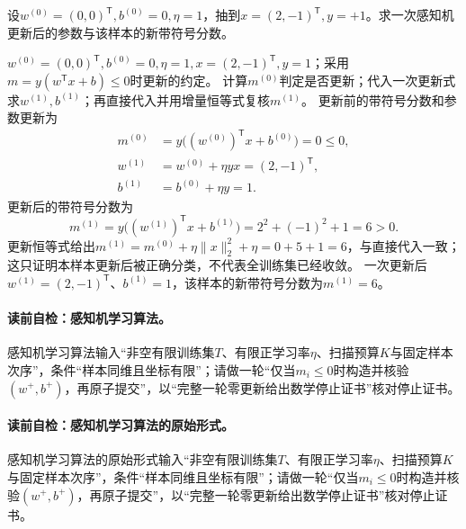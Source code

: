 \label{struct:V2-C01-CH18}
\begin{example}[一次误分类更新]\label{exm:V2-C01-update}
设$w^{(0)}=(0,0)^{\mathsf T},b^{(0)}=0,\eta=1$，抽到$x=(2,-1)^{\mathsf T},y=+1$。求一次感知机更新后的参数与该样本的新带符号分数。
\end{example}
\begin{solution}
\SolGiven $w^{(0)}=(0,0)^{\mathsf T},b^{(0)}=0,\eta=1,x=(2,-1)^{\mathsf T},y=1$；采用$m=y(w^{\mathsf T}x+b)\le0$时更新的约定。
\SolPlan 计算$m^{(0)}$判定是否更新；代入一次更新式求$w^{(1)},b^{(1)}$；再直接代入并用增量恒等式复核$m^{(1)}$。
\SolDerive
更新前的带符号分数和参数更新为
\[
\begin{aligned}
m^{(0)}&=y\bigl((w^{(0)})^{\mathsf T}x+b^{(0)}\bigr)=0\leq0,\\
w^{(1)}&=w^{(0)}+\eta yx=(2,-1)^{\mathsf T},\\
b^{(1)}&=b^{(0)}+\eta y=1.
\end{aligned}
\]
更新后的带符号分数为
\[
m^{(1)}
=y\bigl((w^{(1)})^{\mathsf T}x+b^{(1)}\bigr)
=2^2+(-1)^2+1
=6>0.
\]
\SolCheck 更新恒等式给出$m^{(1)}=m^{(0)}+\eta\|x\|_2^2+\eta=0+5+1=6$，与直接代入一致；这只证明本样本更新后被正确分类，不代表全训练集已经收敛。
\SolAnswer 一次更新后$w^{(1)}=(2,-1)^{\mathsf T}$、$b^{(1)}=1$，该样本的新带符号分数为$m^{(1)}=6$。
\end{solution}


\paragraph{读前自检：感知机学习算法。}感知机学习算法输入“非空有限训练集$T$、有限正学习率$\eta$、扫描预算$K$与固定样本次序”，条件“样本同维且坐标有限”；请做一轮“仅当$m_i\le0$时构造并核验$(w^+,b^+)$，再原子提交”，以“完整一轮零更新给出数学停止证书”核对停止证书。\par
\paragraph{读前自检：感知机学习算法的原始形式。}感知机学习算法的原始形式输入“非空有限训练集$T$、有限正学习率$\eta$、扫描预算$K$与固定样本次序”，条件“样本同维且坐标有限”；请做一轮“仅当$m_i\le0$时构造并核验$(w^+,b^+)$，再原子提交”，以“完整一轮零更新给出数学停止证书”核对停止证书。\par
